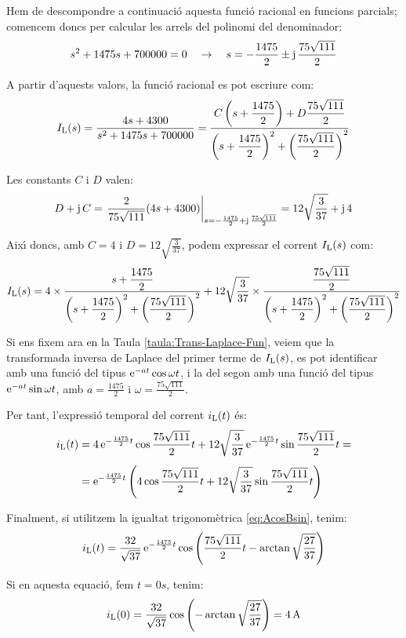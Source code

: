 \begin{exemple}
Hem de descompondre a continuaci\'{o} aquesta funci\'{o} racional en
funcions parcials; comencem doncs per calcular les arrels del
polinomi del denominador:
\[
s^2 +1475 s + 700000 = 0 \quad\rightarrow\quad s= -\frac{1475}{2}
\pm \mathrm{j}\,\frac{75\sqrt{111}}{2}
\]

A partir d'aquests valors, la  funci\'{o} racional es pot escriure com:
\[
    I_\mathrm{L}(s) =
    \frac{4 s+ 4300}{s^2 +1475 s + 700000} =
    \frac{C\left(s+\dfrac{1475}{2}\right)+D\dfrac{75\sqrt{111}}{2}}
    {\left(s+\dfrac{1475}{2}\right)^2+\left(\dfrac{75\sqrt{111}}{2}\right)^2}
\]

Les constants $C$ i $D$ valen:
\[
D + \mathrm{j}\,C = \left.\frac{2}{75\sqrt{111}}(4 s
+4300)\right|_{s=-\frac{1475}{2} + \mathrm{j}\,\frac{75\sqrt{111}}{2}}=
12\sqrt{\frac{3}{37}} +\mathrm{j}\,4
\]

Aix\'{\i} doncs, amb $C=4$ i $D=12\sqrt{\frac{3}{37}}$, podem expressar
el corrent $I_\mathrm{L}(s)$ com:
\[
    I_\mathrm{L}(s) = 4\times\frac{s+\dfrac{1475}{2}}
    {\left(s+\dfrac{1475}{2}\right)^2+\left(\dfrac{75\sqrt{111}}{2}\right)^2}
    + 12\sqrt{\frac{3}{37}}\times\frac{\dfrac{75\sqrt{111}}{2}}
    {\left(s+\dfrac{1475}{2}\right)^2+\left(\dfrac{75\sqrt{111}}{2}\right)^2}
\]


 Si ens fixem ara en la Taula \vref{taula:Trans-Laplace-Fun},
veiem que la transformada inversa de Laplace del primer terme de
$I_\mathrm{L}(s)$, es pot identificar amb una funci\'{o} del tipus
$\mathrm{e}^{-at}\cos\omega t$, i la del segon amb una funci\'{o} del tipus
$\mathrm{e}^{-at}\sin\omega t$, amb $a=\frac{1475}{2}$ i
$\omega=\frac{75\sqrt{111}}{2}$.

Per tant, l'expressi\'{o} temporal del corrent $i_\mathrm{L}(t)$ \'{e}s:
\[\begin{split}
    i_\mathrm{L}(t) &= 4\, \mathrm{e}^{-\frac{1475}{2}t} \cos \frac{75\sqrt{111}}{2} t +
    12\sqrt{\frac{3}{37}}\, \mathrm{e}^{-\frac{1475}{2}t} \sin
    \frac{75\sqrt{111}}{2}t = \\[1ex] &= \mathrm{e}^{-\frac{1475}{2}t} \left( 4
    \cos \frac{75\sqrt{111}}{2} t + 12\sqrt{\frac{3}{37}}\sin
    \frac{75\sqrt{111}}{2}t\right)
\end{split}\]

Finalment, si utilitzem la igualtat trigonom\`{e}trica
\eqref{eq:AcosBsin}, tenim:
\[
i_\mathrm{L}(t) = \frac{32}{\sqrt{37}}\,\mathrm{e}^{-\frac{1475}{2}t}
\cos\left(\frac{75\sqrt{111}}{2} t - \arctan
\sqrt{\frac{27}{37}}\right)
\]

Si en aquesta equaci\'{o}, fem $t=0\unit{s}$, tenim:
\[
    i_\mathrm{L}(0) = \frac{32}{\sqrt{37}} \cos\left( - \arctan
\sqrt{\frac{27}{37}}\right) = 4 \mathrm{\,A}
\]


\end{exemple}
